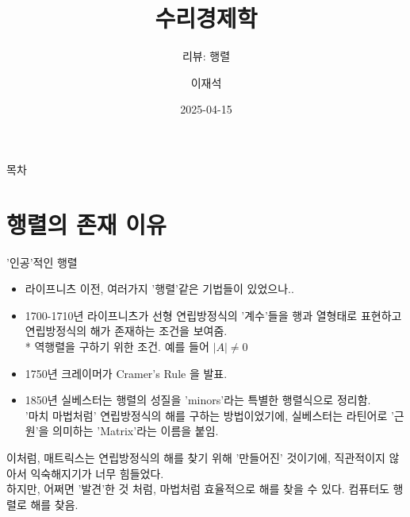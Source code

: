 \documentclass[aspectratio=169]{beamer}
\title{수리경제학}
\subtitle{리뷰: 행렬}
\author{이재석}
\date{2025-04-15}
\begin{document}
\begin{frame}
  \titlepage
\end{frame}

\begin{frame}{목차}
  \tableofcontents
\end{frame}


\section{행렬의 존재 이유}
\begin{frame}{'인공'적인 행렬}
  \begin{itemize}
    \item 라이프니츠 이전, 여러가지 '행렬'같은 기법들이 있었으나..
    \item 1700-1710년 라이프니츠가 선형 연립방정식의 '계수'들을 행과 열형태로 표현하고 연립방정식의 해가 존재하는 조건을 보여줌. \\ %
    * 역행렬을 구하기 위한 조건. 예를 들어 $ \left| A \right| \neq 0$
    \item 1750년 크레이머가 Cramer's Rule 을 발표.
    \item 1850년 실베스터는 행렬의 성질을 'minors'라는 특별한 행렬식으로 정리함. \\
      '마치 마법처럼' 연립방정식의 해를 구하는 방법이었기에, 실베스터는 라틴어로 '근원'을 의미하는 'Matrix'라는 이름을 붙임.
  \end{itemize}
  \vspace{10pt}
  이처럼, 매트릭스는 연립방정식의 해를 찾기 위해 '만들어진' 것이기에, 직관적이지 않아서 익숙해지기가 너무 힘들었다. \\
  하지만, 어쩌면 '발견'한 것 처럼, 마법처럼 효율적으로 해를 찾을 수 있다. 컴퓨터도 행렬로 해를 찾음.
\end{frame}
\end{document}
